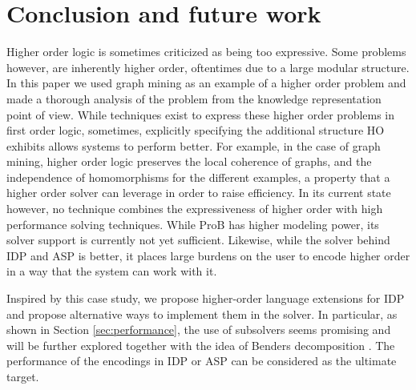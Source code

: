 \section{Conclusion and future work}
\label{sec:conclusion}
Higher order logic is sometimes criticized as being too expressive. Some problems however, are inherently higher order, oftentimes due to a large modular structure. In this paper we used graph mining as an example of a higher order problem and made a thorough analysis of the problem from the knowledge representation point of view. While techniques exist to express these higher order problems in first order logic, sometimes, explicitly specifying the additional structure HO exhibits allows systems to perform better. For example, in the case of graph mining, higher order logic preserves the local coherence of graphs, and the independence of homomorphisms for the different examples, a property that a higher order solver can leverage in order to raise efficiency. In its current state however, no technique combines the expressiveness of higher order with high performance solving techniques. While ProB has higher modeling power, its solver support is currently not yet sufficient. Likewise, while the solver behind IDP and ASP is better, it places large burdens on the user to encode higher order in a way that the system can work with it.

        Inspired by this case study, we propose higher-order language extensions for IDP and propose alternative ways to implement them in the solver. In particular, as shown in Section \ref{sec:performance}, the use of subsolvers seems promising and will be further explored together with the idea of Benders decomposition \citep{Benders}. The performance of the encodings in IDP or ASP can be considered as the ultimate target. 
